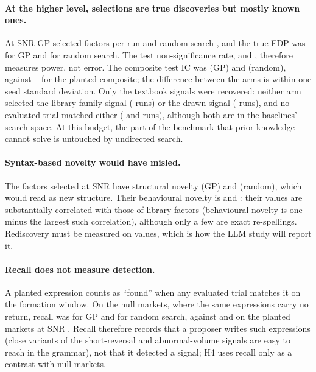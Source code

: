 \paragraph{At the higher level, selections are true discoveries but mostly
known ones.} At SNR \SynSnrHigh{} GP selected
 factors per run and random search
, and the true FDP was  for GP
and  for random search. The test
non-significance rate, 
and , therefore measures
power, not error. The composite test IC was
 (GP) and
 (random), against
\SynOracleHighMin{}--\SynOracleHighMax{} for the planted composite; the
difference between the arms is within one seed standard deviation. Only the
textbook signals were recovered: neither arm selected the library-family
signal (\SynLibraryFamilySelected{} runs) or the drawn signal
(\SynDrawnSelected{} runs), and no evaluated trial matched either
(\SynLibraryFamilyFound{} and \SynDrawnFound{} runs), although both are in
the baselines' search space. At this budget, the part of the benchmark that
prior knowledge cannot solve is untouched by undirected search.

\paragraph{Syntax-based novelty would have misled.} The factors selected at
SNR \SynSnrHigh{} have structural novelty
 (GP) and
 (random), which would read
as new structure. Their behavioural novelty is
 and
: their values are
substantially correlated with those of library factors (behavioural novelty
is one minus the largest such correlation), although only a few are exact
re-spellings. Rediscovery must be measured on values, which is how the LLM
study will report it.

\paragraph{Recall does not measure detection.} A planted expression counts as
``found'' when any evaluated trial matches it on the formation window. On the
null markets, where the same expressions carry no return, recall was
 for GP and
 for random search, against
 and
 on the planted markets at SNR
\SynSnrHigh{}. Recall therefore records that a proposer writes such
expressions (close variants of the short-reversal and abnormal-volume
signals are easy to reach in the grammar), not that it detected a signal; H4 uses recall only as a contrast
with null markets.

